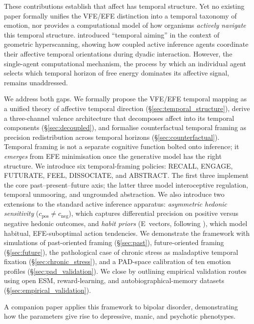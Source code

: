 \documentclass[11pt,a4paper]{article}
\begin{document}
These contributions establish that affect has temporal structure. Yet no existing paper formally unifies the VFE/EFE distinction into a temporal taxonomy of emotion, nor provides a computational model of how organisms \emph{actively navigate} this temporal structure. \citet{hinrichs2025temporal} introduced ``temporal aiming'' in the context of geometric hyperscanning, showing how coupled active inference agents coordinate their affective temporal orientations during dyadic interaction. However, the single-agent computational mechanism, the process by which an individual agent selects which temporal horizon of free energy dominates its affective signal, remains unaddressed.

We address both gaps. We formally propose the VFE/EFE temporal mapping as a unified theory of affective temporal direction (\S\ref{sec:temporal_structure}), derive a three-channel valence architecture that decomposes affect into its temporal components (\S\ref{sec:decoupled}), and formalise counterfactual temporal framing as precision redistribution across temporal horizons (\S\ref{sec:counterfactual}). Temporal framing is not a separate cognitive function bolted onto inference; it \emph{emerges} from EFE minimisation once the generative model has the right structure. We introduce six temporal-framing policies: RECALL, ENGAGE, FUTURATE, FEEL, DISSOCIATE, and ABSTRACT. The first three implement the core past--present--future axis; the latter three model interoceptive regulation, temporal unmooring, and ungrounded abstraction. We also introduce two extensions to the standard active inference apparatus: \emph{asymmetric hedonic sensitivity} ($c_{\text{pos}} \neq c_{\text{neg}}$), which captures differential precision on positive versus negative hedonic outcomes, and \emph{habit priors} (E~vectors, following \citealt{dacosta2020active}), which model habitual, EFE-suboptimal action tendencies. We demonstrate the framework with simulations of past-oriented framing (\S\ref{sec:past}), future-oriented framing (\S\ref{sec:future}), the pathological case of chronic stress as maladaptive temporal fixation (\S\ref{sec:chronic_stress}), and a PAD-space calibration of ten emotion profiles (\S\ref{sec:pad_validation}). We close by outlining empirical validation routes using open ESM, reward-learning, and autobiographical-memory datasets (\S\ref{sec:empirical_validation}).

A companion paper applies this framework to bipolar disorder, demonstrating how the parameters give rise to depressive, manic, and psychotic phenotypes.
\end{document}

